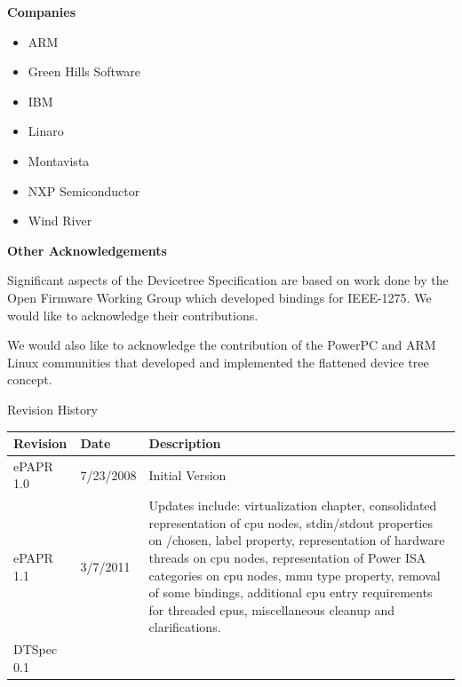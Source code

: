 \documentclass[a4paper,10pt,oneside]{sphinxmanual}
\begin{document}
\textbf{Companies}
\begin{itemize}\setlength{\itemsep}{0pt}\setlength{\parskip}{0pt}
\item {} 
ARM

\item {} 
Green Hills Software

\item {} 
IBM

\item {} 
Linaro

\item {} 
Montavista

\item {} 
NXP Semiconductor

\item {} 
Wind River

\end{itemize}

\textbf{Other Acknowledgements}

Significant aspects of the Devicetree Specification are based on work done by
the Open Firmware Working Group which developed bindings for IEEE-1275.
We would like to acknowledge their contributions.

We would also like to acknowledge the contribution of the PowerPC and ARM Linux
communities that developed and implemented the flattened device
tree concept.
\newpage{}\label{license:revision-history}

\begin{threeparttable}
\capstart\caption{Revision History}\label{license:id1}
\begin{tabulary}{\linewidth}{l l J}
\hline
\textsf{\relax 
Revision
} & \textsf{\relax 
Date
} & \textsf{\relax 
Description
}\\
\hline
ePAPR 1.0
 & 
7/23/2008
 & 
Initial Version
\\
\hline
ePAPR 1.1
 & 
3/7/2011
 & 
Updates include: virtualization chapter, consolidated
representation of cpu nodes, stdin/stdout properties
on /chosen, label property, representation of hardware
threads on cpu nodes, representation of Power ISA
categories on cpu nodes, mmu type property, removal of
some bindings, additional cpu entry requirements for
threaded cpus, miscellaneous cleanup and
clarifications.
\\
\hline
DTSpec 0.1
 &  & \\
\hline\end{tabulary}

\end{threeparttable}
\end{document}
